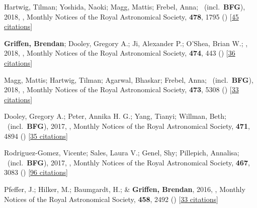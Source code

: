 \item[{\color{numcolor}\scriptsize14}] Hartwig, Tilman; Yoshida, Naoki; Magg, Mattis; Frebel, Anna; \etal\ (incl.\ \textbf{BFG}), 2018, , Monthly Notices of the Royal Astronomical Society, \textbf{478}, 1795 () [\href{https://ui.adsabs.harvard.edu/abs/2018MNRAS.478.1795H}{45 citations}]

\item[{\color{numcolor}\scriptsize13}] \textbf{Griffen, Brendan}; Dooley, Gregory A.; Ji, Alexander P.; O'Shea, Brian W.; \etal, 2018, , Monthly Notices of the Royal Astronomical Society, \textbf{474}, 443 () [\href{https://ui.adsabs.harvard.edu/abs/2018MNRAS.474..443G}{36 citations}]

\item[{\color{numcolor}\scriptsize12}] Magg, Mattis; Hartwig, Tilman; Agarwal, Bhaskar; Frebel, Anna; \etal\ (incl.\ \textbf{BFG}), 2018, , Monthly Notices of the Royal Astronomical Society, \textbf{473}, 5308 () [\href{https://ui.adsabs.harvard.edu/abs/2018MNRAS.473.5308M}{33 citations}]

\item[{\color{numcolor}\scriptsize11}] Dooley, Gregory A.; Peter, Annika H. G.; Yang, Tianyi; Willman, Beth; \etal\ (incl.\ \textbf{BFG}), 2017, , Monthly Notices of the Royal Astronomical Society, \textbf{471}, 4894 () [\href{https://ui.adsabs.harvard.edu/abs/2017MNRAS.471.4894D}{35 citations}]

\item[{\color{numcolor}\scriptsize10}] Rodriguez-Gomez, Vicente; Sales, Laura V.; Genel, Shy; Pillepich, Annalisa; \etal\ (incl.\ \textbf{BFG}), 2017, , Monthly Notices of the Royal Astronomical Society, \textbf{467}, 3083 () [\href{https://ui.adsabs.harvard.edu/abs/2017MNRAS.467.3083R}{96 citations}]

\item[{\color{numcolor}\scriptsize9}] Pfeffer, J.; Hilker, M.; Baumgardt, H.; \& \textbf{Griffen, Brendan}, 2016, , Monthly Notices of the Royal Astronomical Society, \textbf{458}, 2492 () [\href{https://ui.adsabs.harvard.edu/abs/2016MNRAS.458.2492P}{33 citations}]

